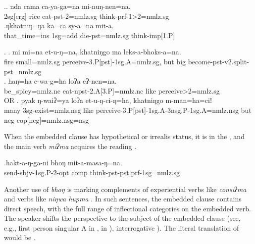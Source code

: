 \ex.\ag. nda cama ca-ya-ga=na mi-nuŋ-nen=na.\\
{\sc 2sg[erg]} rice eat-{\sc pst-2=nmlz.sg} think-{\sc prf-1>2=nmlz.sg}\\
\bg.ŋkhatniŋ=ŋa ka=ca sy-a=na mit-a.\\
that\_time{\sc =ins} {\sc 1sg=add} die{\sc [3sg]-pst=nmlz.sg} think{\sc -imp[1.P]}\\
 
	

\ex. \ag. mi mi=na et-u-ŋ=na, khatniŋgo ma leks-a-bhoks-a=na.\\
	fire small{\sc =nmlz.sg} perceive{\sc -3.P[pst]-1sg.A=nmlz.sg}, but big become{\sc [3sg]-pst-v2.split-pst=nmlz.sg}\\
	\bg. haŋ=ha c-wa-g=ha loʔa eʔ-nen=na.\\
be\_spicy{\sc =nmlz.nc} eat-{\sc npst-2.A[3.P]=nmlz.nc} like perceive{>2=nmlz.sg}\\
 OR
\bg. pyak ŋ-waiʔ=ya loʔa et-u-ŋ-ci-ŋ=ha, khatniŋgo m-man=ha=ciǃ\\
many {\sc 3sg-}exist{\sc =nmlz.nsg} like perceive{\sc -3.P[pst]-1sg.A-3nsg.P-1sg.A=nmlz.nsg} but {\sc neg-cop[neg]=nmlz.nsg=nsg}\\


When the embedded clause has hypothetical or irrealis status, it is in the ,  and the main verb \emph{miʔma}  acquires the reading .

\exg.hakt-a-ŋ-ga-ni bhoŋ mit-a-masa-ŋ=na.\\
send{\sc -sbjv-1sg.P-2-opt} {\sc comp} think{\sc -pst-pst.prf-1sg=nmlz.sg}\\


Another use of \emph{bhoŋ} is marking complements of experiential verbs like \emph{consiʔma}  and verbs like \emph{niŋwa hupma} . In such sentences, the embedded clause contains direct speech, with the full range of inflectional categories  on the embedded verb. The speaker shifts the perspective to the subject of the embedded clause (see, e.g., first person singular A in \Next[a],   in \Next[b]), interrogative  \Next[c]).  The literal translation of \Next[a] would be . 
 
